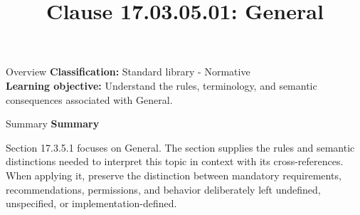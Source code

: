 \documentclass[10pt,letterpaper]{article}
\title{Clause 17.03.05.01: General}
\author{}
\date{}
\begin{document}
\maketitle
\begin{CornellOverviewBox}{Overview}
\textbf{Classification:} Standard library - Normative\\[2pt]
\textbf{Learning objective:} Understand the rules, terminology, and semantic consequences associated with General.
\end{CornellOverviewBox}\begin{CornellSummaryBox}{Summary}
{\sffamily\bfseries\color{Accent} Summary}\par\vspace{3pt}Section 17.3.5.1 focuses on General. The section supplies the rules and semantic distinctions needed to interpret this topic in context with its cross-references. When applying it, preserve the distinction between mandatory requirements, recommendations, permissions, and behavior deliberately left undefined, unspecified, or implementation-defined.
\end{CornellSummaryBox}
\end{document}
